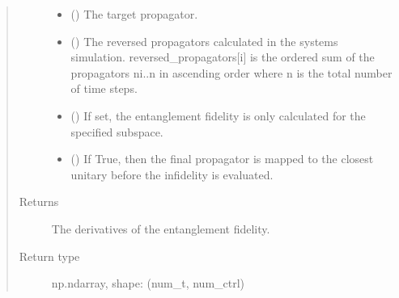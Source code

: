 \documentclass[letterpaper,10pt,english]{sphinxmanual}
\begin{document}
\begin{fulllineitems}
\begin{quote}
\begin{description}
\begin{itemize}
\item {} 
 () \textendash{} The target propagator.

\item {} 
 (\sphinxstyleliteralemphasis{\sphinxupquote{{[}}}\sphinxstyleliteralemphasis{\sphinxupquote{{]}}}) \textendash{} The reversed propagators calculated in the systems simulation.
reversed\_propagators{[}i{]} is the ordered sum of the propagators n\sphinxhyphen{}i..n in
ascending order where n is the total number of time steps.

\item {} 
 (\sphinxstyleliteralemphasis{\sphinxupquote{{[}}}\sphinxstyleliteralemphasis{\sphinxupquote{{[}}}\sphinxstyleliteralemphasis{\sphinxupquote{{]}}}\sphinxstyleliteralemphasis{\sphinxupquote{{]}}}) \textendash{} If set, the entanglement fidelity is only calculated for the specified
subspace.

\item {} 
 () \textendash{} If True, then the final propagator is mapped to the closest unitary
before the infidelity is evaluated.

\end{itemize}

\item[{Returns}] \leavevmode
{} \textendash{} The derivatives of the entanglement fidelity.

\item[{Return type}] \leavevmode
np.ndarray, shape: (num\_t, num\_ctrl)

\end{description}\end{quote}

\end{fulllineitems}

\end{document}
